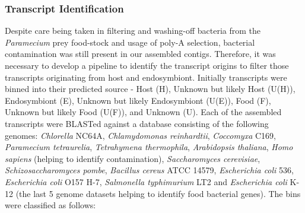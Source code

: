 \subsubsection{Transcript Identification}
Despite care being taken in filtering and washing-off bacteria from the \textit{Paramecium} prey food-stock and usage of poly-A selection, bacterial contamination was still present in our assembled contigs.  
Therefore, it was necessary to develop a pipeline to identify the transcript origins to filter those transcripts originating from host and endosymbiont. 
Initially transcripts were binned into their predicted source - Host (H), Unknown but likely Host (U(H)), Endosymbiont (E), Unknown but likely Endosymbiont (U(E)), Food (F), Unknown but likely Food (U(F)), and Unknown (U).  
Each of the assembled transcripts were BLASTed against a database consisting of the following genomes: \textit{Chlorella} NC64A, \textit{Chlamydomonas reinhardtii}, \textit{Coccomyxa} C169, \textit{Paramecium tetraurelia}, \textit{Tetrahymena thermophila},  \textit{Arabidopsis thaliana}, \textit{Homo sapiens} (helping to identify contamination), \textit{Saccharomyces cerevisiae}, \textit{Schizosaccharomyces pombe}, \textit{Bacillus cereus} ATCC 14579, \textit{Escherichia coli} 536, \textit{Escherichia coli} O157 H-7, \textit{Salmonella typhimurium} LT2 and \textit{Escherichia coli} K-12 (the last 5 genome datasets helping to identify food bacterial genes).  
The bins were classified as follows:
